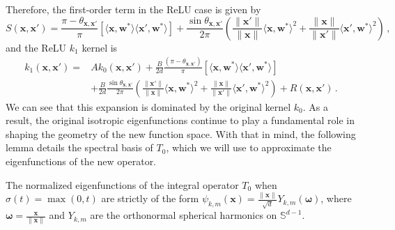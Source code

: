 Therefore, the first-order term in the ReLU case is given by
\begin{equation}\label{eq:S-relu}
    S(\bm x, \bm x') = \frac{\pi - \theta_{\bm x, \bm x'}}{\pi }[\langle \bm x, \bm w^*\rangle\langle \bm x', \bm w^*\rangle] + \frac{\sin \theta_{\bm x, \bm x'}}{2\pi}\left(\frac{\|\bm x'\|}{\|\bm x\|}\langle \bm x, \bm w^*\rangle^2 + \frac{\|\bm x\|}{\|\bm x'\|}\langle \bm x', \bm w^*\rangle^2\right)\,,
\end{equation}
and the ReLU $k_1$ kernel is
\begin{align*}
    k_1(\bm x, \bm x') =& Ak_0(\bm x, \bm x') + \frac{B}{2d}\frac{(\pi - \theta_{\bm x, \bm x'})}{\pi }[\langle \bm x, \bm w^*\rangle\langle \bm x', \bm w^*\rangle] \\
    &+ {\frac{B}{2d}} \frac{\sin \theta_{\bm x, \bm x'}}{2\pi}\left(\frac{\|\bm x'\|}{\|\bm x\|}\langle \bm x, \bm w^*\rangle^2 + \frac{\|\bm x\|}{\|\bm x'\|}\langle \bm x', \bm w^*\rangle^2\right) + R(\bm x, \bm x')\, .
\end{align*}
We can see that this expansion is dominated by the original kernel $k_0$. As a result, the original isotropic eigenfunctions continue to play a fundamental role in shaping the geometry of the new function space. With that in mind, the following lemma details the spectral basis of $T_0$, which we will use to approximate the eigenfunctions of the new operator. 
\begin{lemma}\label{lemma:iso-eigenfn}
    The normalized eigenfunctions of the integral operator $T_0$ when $\sigma(t) = \max(0, t)$ are strictly of the form $\psi_{k,m}(\bm x) = \frac{\|\bm x\|}{\sqrt d}Y_{k,m}(\bm \omega)$, where $ \bm \omega = \frac{\bm x}{\|\bm x\|}$ and $Y_{k,m}$ are the orthonormal spherical harmonics on $\mathbb S^{d-1}$.
\end{lemma}
